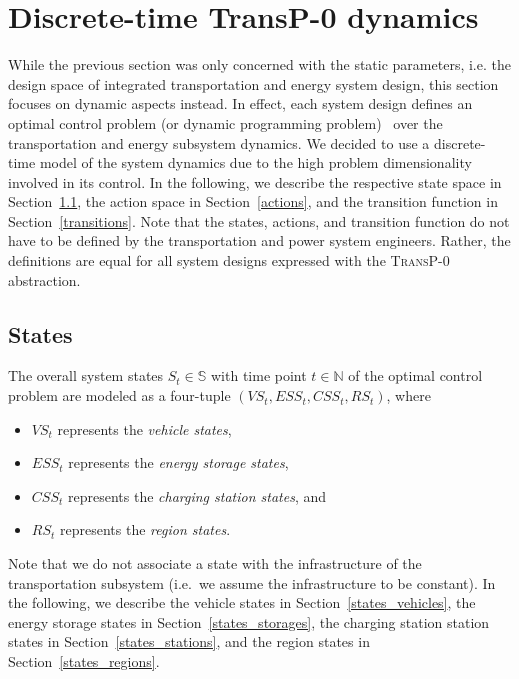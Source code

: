\section{Discrete-time \textbf{TransP-0} dynamics}
\label{dynamics}

While the previous section was only concerned with the static parameters, i.e. the design space of integrated transportation and energy system design, this section focuses on dynamic aspects instead. In effect, each system design defines an optimal control problem (or dynamic programming problem)~\cite{Bertsekas1995} over the transportation and energy subsystem dynamics. We decided to use a discrete-time model of the system dynamics due to the high problem dimensionality involved in its control. In the following, we describe the respective state space in Section~\ref{states}, the action space in Section~\ref{actions}, and the transition function in Section~\ref{transitions}. Note that the states, actions, and transition function do not have to be defined by the transportation and power system engineers. Rather, the definitions are equal for all system designs expressed with the \textsc{TransP-0} abstraction.

\subsection{States}
\label{states}

The overall system states $S_t \in \mathbb{S}$ with time point $t \in \mathbb{N}$ of the optimal control problem are modeled as a four-tuple $(VS_t, ESS_t, CSS_t, RS_t)$, where
\begin{itemize}
	\item $VS_t$ represents the \textit{vehicle states},
	\item $ESS_t$ represents the \textit{energy storage states},
	\item $CSS_t$ represents the \textit{charging station states}, and
	\item $RS_t$ represents the \textit{region states}.
\end{itemize}
Note that we do not associate a state with the infrastructure of the transportation subsystem (i.e.\ we assume the infrastructure to be constant). In the following, we describe the vehicle states in Section~\ref{states_vehicles}, the energy storage states in Section~\ref{states_storages}, the charging station station states in Section~\ref{states_stations}, and the region states in Section~\ref{states_regions}.


